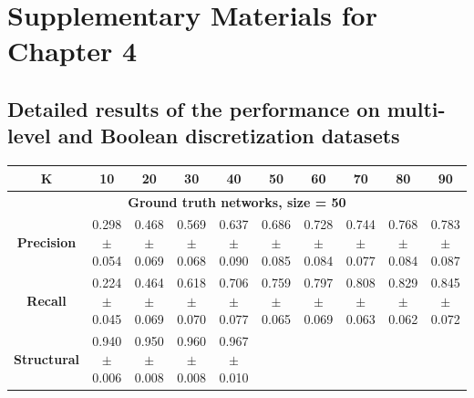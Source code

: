 
\chapter{Supplementary Materials for Chapter 4} %

\label{AppendixC} %

\section*{Detailed results of the performance on multi-level and Boolean discretization datasets}
\begin{table}[h!]
\centering
\small
\begin{tabular}{|c|ccccccccc|}
\hline
\textbf{K} & 10 & 20 & 30 & 40 & 50 & 60 & 70 & 80 & 90 \\
\hline
\multicolumn{10}{|c|}{\textbf{Ground truth networks, size = 50}} \\
\hline
\textbf{Precision} & 
\makecell{0.298 \\ $\pm$0.054} & \makecell{0.468 \\ $\pm$0.069} & \makecell{0.569 \\ $\pm$0.068} & \makecell{0.637 \\ $\pm$0.090} & 
\makecell{0.686 \\ $\pm$0.085} & \makecell{0.728 \\ $\pm$0.084} & \makecell{0.744 \\ $\pm$0.077} & \makecell{0.768 \\ $\pm$0.084} & \makecell{0.783 \\ $\pm$0.087} \\
\hline
\textbf{Recall} & 
\makecell{0.224 \\ $\pm$0.045} & \makecell{0.464 \\ $\pm$0.069} & \makecell{0.618 \\ $\pm$0.070} & \makecell{0.706 \\ $\pm$0.077} & 
\makecell{0.759 \\ $\pm$0.065} & \makecell{0.797 \\ $\pm$0.069} & \makecell{0.808 \\ $\pm$0.063} & \makecell{0.829 \\ $\pm$0.062} & \makecell{0.845 \\ $\pm$0.072} \\
\hline
\textbf{Structural} & 
\makecell{0.940 \\ $\pm$0.006} & \makecell{0.950 \\ $\pm$0.008} & \makecell{0.960 \\ $\pm$0.008} & \makecell{0.967 \\ $\pm$0.010} & 

\end{tabular}
\end{table}
